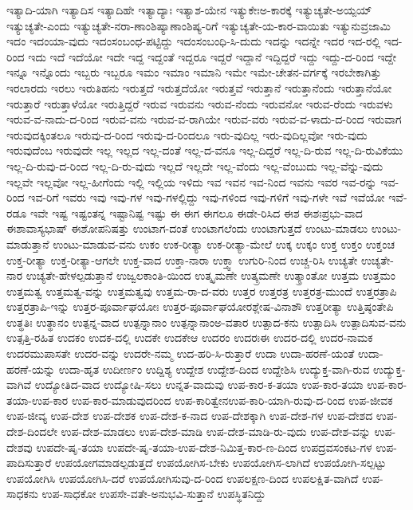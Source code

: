 {ಇತ್ಯಾದಿ-ಯಾಗಿ
ಇತ್ಯಾದಿಸ
ಇತ್ಯಾದಿಹೇ
ಇತ್ಯಾದ್ಯಾಃ
ಇತ್ಯಾಶ-ಯೇನ
ಇತ್ಯುಕೇಃಅ-ಕಾರಕ್ಕೆ
ಇತ್ಯುಚ್ಯತೇ-ಅಯ್ಪಯ್
ಇತ್ಯುಚ್ಯತೇ-ಎಂದು
ಇತ್ಯುಚ್ಯತೇ-ನರಾ-ಣಾಂಶಿಷ್ಯಾಣಾಂಶಿಷ್ಯ-ರಿಗೆ
ಇತ್ಯುಚ್ಯತೇ-ಯ-ಕಾರ-ವಾಯಿತು
ಇತ್ಯುನುವ್ರಜಾಮಿ
ಇದಂ
ಇದಂಯಾ-ವುದು
ಇದಂಸಂಬಂಧ-ಪಟ್ಟಿದ್ದು
ಇದಂಸಂಬಂಧಿ-ಸಿ-ದುದು
ಇದನ್ನು
ಇದನ್ನೇ
ಇದರ
ಇದ-ರಲ್ಲಿ
ಇದ-ರಿಂದ
ಇದು
ಇದೆ
ಇದೆಯೋ
ಇದೇ
ಇದ್ದ
ಇದ್ದಂತೆ
ಇದ್ದರೂ
ಇದ್ದರೆ
ಇದ್ದಾನೆ
ಇದ್ದಿದ್ದರೆ
ಇದ್ದು
ಇದ್ದು-ದ-ರಿಂದ
ಇದ್ದೇ
ಇನ್ನೂ
ಇನ್ನೊಂದು
ಇಬ್ಬರು
ಇಬ್ಬರೂ
ಇಮಂ
ಇಮಾಂ
ಇಮಾನಿ
ಇಮೇ
ಇಮೇ-ಚೇತನ-ವರ್ಗಕ್ಕೆ
ಇರಬೇಕಾಗಿತ್ತು
ಇರಲಾರದು
ಇರಲು
ಇರುತಿಹನು
ಇರುತ್ತದೆ
ಇರುತ್ತದೆಯೋ
ಇರುತ್ತವೆ
ಇರುತ್ತಾನೆ
ಇರುತ್ತಾನೆಂದು
ಇರುತ್ತಾನೆಯೋ
ಇರುತ್ತಾರೆ
ಇರುತ್ತಾಳೆಯೋ
ಇರುತ್ತಿದ್ದರೆ
ಇರುವ
ಇರುವನು
ಇರುವ-ನೆಂದು
ಇರುವನೋ
ಇರುವ-ರೆಂದು
ಇರುವಳು
ಇರುವ-ವ-ನಾದು-ದ-ರಿಂದ
ಇರುವ-ವನು
ಇರುವ-ವ-ರಾಗಿಯೇ
ಇರುವ-ವರು
ಇರುವ-ವ-ಳಾದು-ದ-ರಿಂದ
ಇರುವಾಗ
ಇರುವುದಕ್ಕಿಂತಲೂ
ಇರುವು-ದ-ರಿಂದ
ಇರುವು-ದ-ರಿಂದಲೂ
ಇರು-ವುದಿಲ್ಲ
ಇರು-ವುದಿಲ್ಲವೋ
ಇರು-ವುದು
ಇರುವುದೆಂಬ
ಇರುವುದೇ
ಇಲ್ಲ
ಇಲ್ಲದ
ಇಲ್ಲ-ದಂತೆ
ಇಲ್ಲ-ದ-ವನೂ
ಇಲ್ಲ-ದಿದ್ದರೆ
ಇಲ್ಲ-ದಿ-ರುವ
ಇಲ್ಲ-ದಿ-ರುವಿಕೆಯು
ಇಲ್ಲ-ದಿ-ರುವು-ದ-ರಿಂದ
ಇಲ್ಲ-ದಿ-ರು-ವುದು
ಇಲ್ಲದೆ
ಇಲ್ಲದೇ
ಇಲ್ಲ-ವೆಂದು
ಇಲ್ಲ-ವೆಂಬುದು
ಇಲ್ಲ-ವೆನ್ನು-ವುದು
ಇಲ್ಲವೇ
ಇಲ್ಲವೋ
ಇಲ್ಲ-ಹೀಗೆಂದು
ಇಲ್ಲಿ
ಇಲ್ಲಿಯ
ಇಳಿದು
ಇವ
ಇವನ
ಇವ-ನಿಂದ
ಇವನು
ಇವರ
ಇವ-ರನ್ನು
ಇವ-ರಿಂದ
ಇವ-ರಿಗೆ
ಇವರು
ಇವು
ಇವು-ಗಳ
ಇವು-ಗಳಲ್ಲಿದ್ದು
ಇವು-ಗಳಿಂದ
ಇವು-ಗಳಿಗೆ
ಇವು-ಗಳೇ
ಇವೆ
ಇವೆಯೋ
ಇವೆ-ರಡೂ
ಇವೇ
ಇಷ್ಟ
ಇಷ್ಟಂತನ್ನ
ಇಷ್ಟಾನಿಷ್ಟ
ಇಷ್ಟು
ಈ
ಈಗ
ಈಗಲೂ
ಈಡೇ-ರಿಸಿದ
ಈಶ
ಈಶಃಪ್ರಭು-ವಾದ
ಈಶಾವಾಸ್ಯಭಾಷ್
ಈಶೋಪನಿಷತ್ತು
ಉಂಟಾಗ-ದಂತೆ
ಉಂಟಾಗಲೆಂದು
ಉಂಟಾಗುತ್ತದೆ
ಉಂಟು-ಮಾಡಲು
ಉಂಟು-ಮಾಡುತ್ತಾನೆ
ಉಂಟು-ಮಾಡುವ-ವನು
ಉಕಂ
ಉಕ-ರೀತ್ಯಾ
ಉಕ-ರೀತ್ಯಾ-ಮೇಲೆ
ಉಕ್ಕ
ಉಕ್ಕಂ
ಉಕ್ತ
ಉಕ್ತಂ
ಉಕ್ತಂಚ
ಉಕ್ತ-ರೀತ್ಯಾ
ಉಕ್ತ-ರೀತ್ಯಾ-ಆಗಲೇ
ಉಕ್ತ-ವಾದ
ಉಕ್ತಾ-ನಾರಾ
ಉಕ್ತ್ವಾ
ಉಗುರಿ-ನಿಂದ
ಉಚ್ಚ-ರಿಸಿ
ಉಚ್ಯತೇ
ಉಚ್ಯತೇ-ನಾರ
ಉಚ್ಯತೇ-ಹೇಳಲ್ಪಡುತ್ತಾನೆ
ಉಜ್ವಲಕಾಂತಿ-ಯಿಂದ
ಉತ್ಕೃಮಣೇ
ಉತ್ಕ್ರಮಣೇ
ಉತ್ಕ್ರಾಂತೋ
ಉತ್ತಮ
ಉತ್ತಮಂ
ಉತ್ತಮತ್ವ
ಉತ್ತಮತ್ವ-ವನ್ನು
ಉತ್ತಮತ್ವವು
ಉತ್ತಮ-ರಾ-ದ-ವರು
ಉತ್ತರ
ಉತ್ತರತ್ರ
ಉತ್ತರತ್ರ-ಮುಂದೆ
ಉತ್ತರತ್ರಾಪಿ
ಉತ್ತರತ್ರಾಪಿ-ಇನ್ನು
ಉತ್ತರ-ಪೂರ್ವಾಘಯೋಃ
ಉತ್ತರ-ಪೂರ್ವಾಘಯೋರಶ್ಲೇಷ-ವಿನಾಶೌ
ಉತ್ತರೀತ್ಯಾ
ಉತ್ತಿಷ್ಠಂತೇಪಿ
ಉತ್ಥತಿಃ
ಉತ್ಥಾನಂ
ಉತ್ಪನ್ನ-ವಾದ
ಉತ್ಪನ್ನಾನಾಂ
ಉತ್ಪನ್ನಾನಾಂಅ-ವತಾರ
ಉತ್ಪಾದ-ಕನು
ಉತ್ಪಾದಿಸಿ
ಉತ್ಪಾದಿಸುವ-ವನು
ಉತ್ಸತ್ತಿ-ರಹಿತ
ಉದಕಂ
ಉದಕ-ದಲ್ಲಿ
ಉದಕೇ
ಉದಕೇಆ
ಉದರಂ
ಉದರಃಈ
ಉದರ-ದಲ್ಲಿ
ಉದರ-ನಾಮಕ
ಉದರಮುಪಾಸತೇ
ಉದರ-ವನ್ನು
ಉದರೇ-ನಮ್ಮ
ಉದ-ಹರಿ-ಸಿ-ರುತ್ತಾರೆ
ಉದಾ
ಉದಾ-ಹರಣೆ-ಯಂತೆ
ಉದಾ-ಹರಣೆ-ಯನ್ನು
ಉದಾ-ಹೃತ
ಉದೀರ್ಣಂ
ಉದ್ದಿಶ್ಯ
ಉದ್ದೇಶ
ಉದ್ದೇಶ-ದಿಂದ
ಉದ್ದೇಶಿಸಿ
ಉದ್ಯುಕ್ತ-ವಾಗಿ-ರುವ
ಉದ್ಯುಕ್ತ-ವಾಗಿವೆ
ಉದ್ಯೋತಿದ-ವಾದ
ಉದ್ಯೋಷಿ-ಸಲು
ಉನ್ನತ-ವಾದುವು
ಉಪ-ಕಾರ-ಕ-ತಯಾ
ಉಪ-ಕಾರ-ತಯಾ
ಉಪ-ಕಾರ-ತಯಾ-ಉಪ-ಕಾರ
ಉಪ-ಕಾರ-ಮಾಡುವುದರಿಂದ
ಉಪ-ಕಾರಿತ್ವೇನಉಪ-ಕಾರಿ-ಯಾಗಿ-ರುವು-ದ-ರಿಂದ
ಉಪ-ಜೀವಕ
ಉಪ-ಜೀವ್ಯ
ಉಪ-ದೇಶ
ಉಪ-ದೇಶಕ
ಉಪ-ದೇಶ-ಕ-ನಾದ
ಉಪ-ದೇಶಕ್ಕಾಗಿ
ಉಪ-ದೇಶ-ಗಳ
ಉಪ-ದೇಶದ
ಉಪ-ದೇಶ-ದಿಂದಲೇ
ಉಪ-ದೇಶ-ಮಾಡಲು
ಉಪ-ದೇಶ-ಮಾಡಿ
ಉಪ-ದೇಶ-ಮಾಡಿ-ರು-ವುದು
ಉಪ-ದೇಶ-ವನ್ನು
ಉಪ-ದೇಶವು
ಉಪದೇ-ಷೃ-ತಯಾ
ಉಪದೇ-ಷೃ-ತಯಾ-ಉಪ-ದೇಶ-ನಿಮಿತ್ತ-ಕಾರ-ಣ-ದಿಂದ
ಉಪದ್ರವಸಂಕಟ-ಗಳ
ಉಪ-ಪಾದಿಸುತ್ತಾರೆ
ಉಪಯೋಗಮಾಡಲ್ಪಡುತ್ತದೆ
ಉಪಯೋಗಿಸ-ಬೇಕು
ಉಪಯೋಗಿಸ-ಲಾಗಿದೆ
ಉಪಯೋಗಿ-ಸಲ್ಪಟ್ಟು
ಉಪಯೋಗಿಸಿ
ಉಪಯೋಗಿಸಿ-ದರೆ
ಉಪಯೋಗಿಸುವು-ದ-ರಿಂದ
ಉಪಲಕ್ಷಣ-ದಿಂದ
ಉಪಲಕ್ಷಿತ-ವಾಗಿದೆ
ಉಪ-ಸಾಧಕನು
ಉಪ-ಸಾಧಕೋ
ಉಪಸೇ-ವತೇ-ಅನುಭವಿ-ಸುತ್ತಾನೆ
ಉಪಸ್ಥಿತನಿದ್ದು
}

